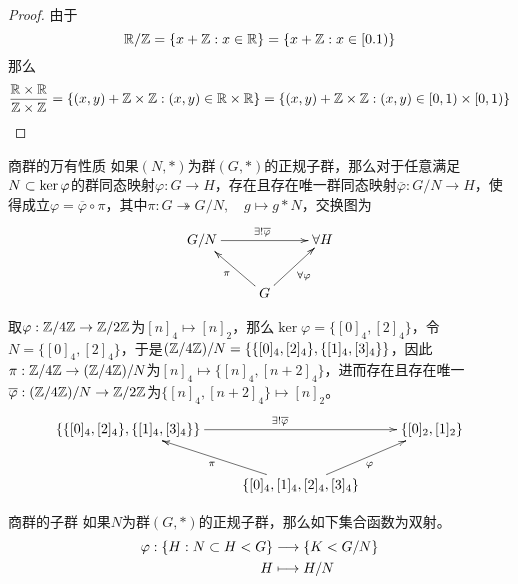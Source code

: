 \begin{proof}
	由于
	$$
	\mathbb{R}/\mathbb{Z}=\{ x+\mathbb{Z}:x\in\mathbb{R} \}=\{ x+\mathbb{Z}:x\in[0.1) \}
	$$
	那么
	$$
	\frac{\mathbb{R}\times \mathbb{R}}{\mathbb{Z}\times\mathbb{Z}}
	=\{ (x,y)+\mathbb{Z}\times\mathbb{Z}:(x,y)\in\mathbb{R}\times\mathbb{R} \}
	=\{ (x,y)+\mathbb{Z}\times\mathbb{Z}:(x,y)\in[0,1)\times[0,1) \}
	$$
\end{proof}

\begin{theorem}{商群的万有性质}
	如果$(N,*)$为群$(G,*)$的正规子群，那么对于任意满足$N\subset\ker\varphi$的群同态映射$\varphi:G\to H$，存在且存在唯一群同态映射$\overline{\varphi}:G/N\to H$，使得成立$\varphi=\overline{\varphi}\circ\pi$，其中$\pi:G\twoheadrightarrow G/N,\quad g\mapsto g*N$，交换图为
	$$
	\xymatrix{
		G/N \ar^{\exists!\overline{\varphi}}[rr]& &\forall H\\
		& G \ar[ul]^{\pi} \ar[ur]_{\forall\varphi} &
	}
	$$
\end{theorem}

\begin{example}
	取$\varphi:\mathbb{Z}/4\mathbb{Z}\to\mathbb{Z}/2\mathbb{Z}$为$[n]_4\mapsto[n]_2$，那么$\ker\varphi=\{ [0]_4,[2]_4 \}$，令$N=\{ [0]_4,[2]_4 \}$，于是$(\mathbb{Z}/4\mathbb{Z})/N=\{ \{ [0]_4,[2]_4 \},\{ [1]_4,[3]_4 \} \}$，因此$\pi:\mathbb{Z}/4\mathbb{Z}\to (\mathbb{Z}/4\mathbb{Z})/N$为$[n]_4\mapsto\{ [n]_4,[n+2]_4 \}$，进而存在且存在唯一$\overline{\varphi}:(\mathbb{Z}/4\mathbb{Z})/N\to\mathbb{Z}/2\mathbb{Z}$为$\{ [n]_4,[n+2]_4 \}\mapsto [n]_2$。
	$$
	\xymatrix{
		\{ \{ [0]_4,[2]_4 \},\{ [1]_4,[3]_4 \} \} \ar^{\exists!\overline{\varphi}}[rr]& & \{ [0]_2,[1]_2 \}\\
		& \{ [0]_4,[1]_4,[2]_4,[3]_4 \} \ar[ul]^{\pi} \ar[ur]_{\varphi} &
	}
	$$
\end{example}

\begin{proposition}{商群的子群}
	如果$N$为群$(G,*)$的正规子群，那么如下集合函数为双射。
	\begin{align*}
		\varphi:\begin{aligned}[t]
			\{ H:N\subset H < G \}&\longrightarrow \{ K< G/N \}\\
			H&\longmapsto H/N
		\end{aligned}
	\end{align*}
\end{proposition}

